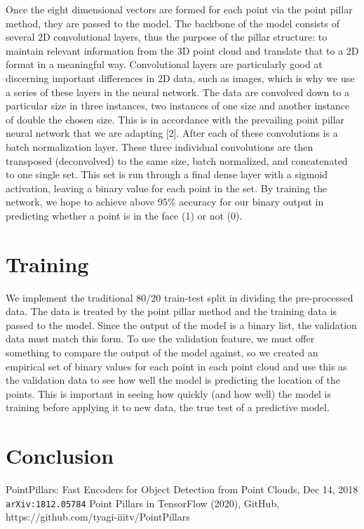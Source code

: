 \documentclass{article}
\begin{document}
Once the eight dimensional vectors are formed for each point via the point pillar method, they are passed to the model. The backbone of the model consists of several 2D convolutional layers, thus the purpose of the pillar structure: to maintain relevant information from the 3D point cloud and translate that to a 2D format in a meaningful way. Convolutional layers are particularly good at discerning important differences in 2D data, such as images, which is why we use a series of these layers in the neural network. The data are convolved down to a particular size in three instances, two instances of one size and another instance of double the chosen size. This is in accordance with the prevailing point pillar neural network that we are adapting [2]. After each of these convolutions is a batch normalization layer. These three individual convolutions are then transposed (deconvolved) to the same size, batch normalized, and concatenated to one single set. This set is run through a final dense layer with a sigmoid activation, leaving a binary value for each point in the set. By training the network, we hope to achieve above 95\% accuracy for our binary output in predicting whether a point is in the face (1) or not (0).

\section{Training} 

We implement the traditional 80/20 train-test split in dividing the pre-processed data. The data is treated by the point pillar method and the training data is passed to the model. Since the output of the model is a binary list, the validation data must match this form. To use the validation feature, we must offer something to compare the output of the model against, so we created an empirical set of binary values for each point in each point cloud and use this as the validation data to see how well the model is predicting the location of the points. This is important in seeing how quickly (and how well) the model is training before applying it to new data, the true test of a predictive model. 

\section{Conclusion} 

\begin{thebibliography}{9} 
 PointPillars: Fast Encoders for Object Detection from Point Clouds, Dec 14, 2018 \\\texttt{arXiv:1812.05784} 
 Point Pillars in TensorFlow (2020), GitHub, https://github.com/tyagi-iiitv/PointPillars 
\end{thebibliography} 
\end{document}
